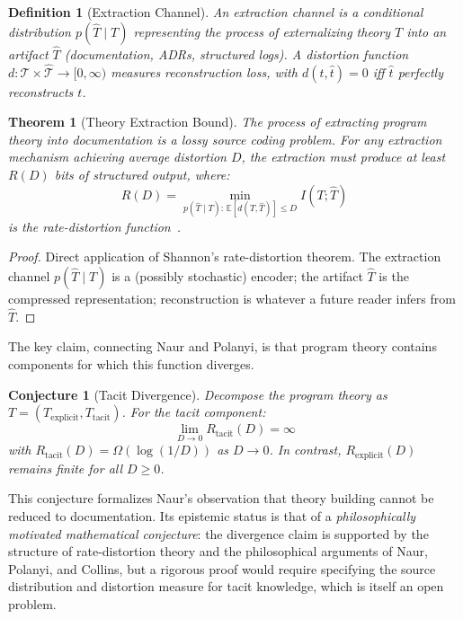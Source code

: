 \documentclass[11pt, a4paper, logo, copyright]{googledeepmind}
\newtheorem{definition}{Definition}[section]
\newtheorem{theorem}{Theorem}[section]
\newtheorem{conjecture}{Conjecture}[section]
\begin{document}
\begin{definition}[Extraction Channel]
An \emph{extraction channel} is a conditional distribution $p(\hat{T} \mid T)$ representing the process of externalizing theory $T$ into an artifact $\hat{T}$ (documentation, ADRs, structured logs). A \emph{distortion function} $d: \mathcal{T} \times \hat{\mathcal{T}} \to [0, \infty)$ measures reconstruction loss, with $d(t, \hat{t}) = 0$ iff $\hat{t}$ perfectly reconstructs $t$.
\end{definition}

\begin{theorem}[Theory Extraction Bound]
\label{thm:extraction}
The process of extracting program theory into documentation is a lossy source coding problem. For any extraction mechanism achieving average distortion $D$, the extraction must produce at least $R(D)$ bits of structured output, where:
\begin{equation}
    R(D) = \min_{p(\hat{T} \mid T): \, \mathbb{E}[d(T, \hat{T})] \leq D} I(T; \hat{T})
\end{equation}
is the rate-distortion function~\citep{shannon1959, cover2006}.
\end{theorem}

\begin{proof}
Direct application of Shannon's rate-distortion theorem. The extraction channel $p(\hat{T} \mid T)$ is a (possibly stochastic) encoder; the artifact $\hat{T}$ is the compressed representation; reconstruction is whatever a future reader infers from $\hat{T}$.
\end{proof}

The key claim, connecting Naur and Polanyi, is that program theory contains components for which this function diverges.

\begin{conjecture}[Tacit Divergence]
\label{conj:tacit}
Decompose the program theory as $T = (T_{\mathrm{explicit}}, T_{\mathrm{tacit}})$. For the tacit component:
\begin{equation}
    \lim_{D \to 0} R_{\mathrm{tacit}}(D) = \infty
\end{equation}
with $R_{\mathrm{tacit}}(D) = \Omega(\log(1/D))$ as $D \to 0$. In contrast, $R_{\mathrm{explicit}}(D)$ remains finite for all $D \geq 0$.
\end{conjecture}

This conjecture formalizes Naur's observation that theory building cannot be reduced to documentation. Its epistemic status is that of a \emph{philosophically motivated mathematical conjecture}: the divergence claim is supported by the structure of rate-distortion theory and the philosophical arguments of Naur, Polanyi, and Collins, but a rigorous proof would require specifying the source distribution and distortion measure for tacit knowledge, which is itself an open problem.
\end{document}

